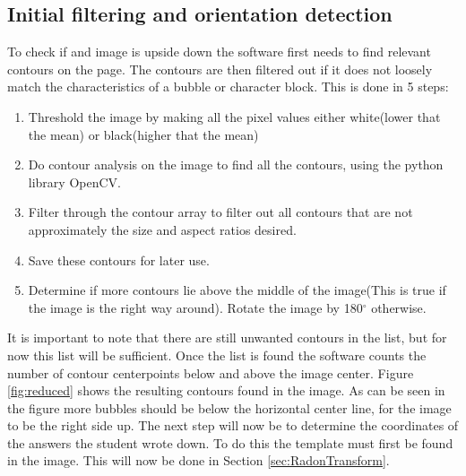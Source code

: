 \subsection{Initial filtering and orientation detection}
\label{sec:InitImageFilter}

To check if and image is upside down the software first needs to find relevant contours on the page. The contours are then filtered out if it does not loosely match the characteristics of a bubble or character block. This is done in 5 steps:

\begin{enumerate}
\item Threshold the image by making all the pixel values either white(lower that the mean) or black(higher that the mean)
\item Do contour analysis on the image to find all the contours, using the python library OpenCV.
\item Filter through the contour array to filter out all contours that are not approximately the size and aspect ratios desired.
\item Save these contours for later use.
\item Determine if more contours lie above the middle of the image(This is true if the image is the right way around). Rotate the image by 180$^{\circ}$ otherwise.
\end{enumerate}

It is important to note that there are still unwanted contours in the list, but for now this list will be sufficient. Once the list is found the software counts the number of contour centerpoints below and above the image center. Figure \ref{fig:reduced} shows the resulting contours found in the image. As can be seen in the figure more bubbles should be below the horizontal center line, for the image to be the right side up. The next step will now be to determine the coordinates of the answers the student wrote down. To do this the template must first be found in the image. This will now be done in Section \ref{sec:RadonTransform}.

